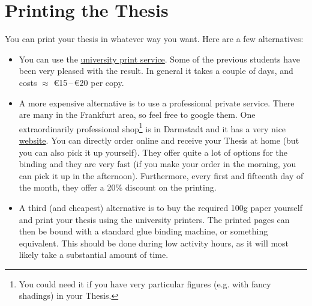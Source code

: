 \documentclass[a4paper]{article}
\begin{document}
    \section*{Printing the Thesis}
        You can print your thesis in whatever way you want. Here are a few alternatives:
        \begin{itemize}
            \item You can use the \href{http://druck.uni-frankfurt.de/druckzentrum/}{university print service}.
                  Some of the previous students have been very pleased with the result. In general it takes a couple of days,
                  and costs $\approx$ \euro{}15\,--\,\euro{}20 per copy.
            \item A more expensive alternative is to use a professional private service.
                  There are many in the Frankfurt area, so feel free to google them.
                  One extraordinarily professional shop\footnote{You could need it if you have very particular figures (e.g.
                    with fancy shadings) in your Thesis.} is in Darmstadt and it has a very nice \href{http://www.der-felger.de/}{website}.
                  You can directly order online and receive your Thesis at home (but you can also pick it up yourself).
                  They offer quite a lot of options for the binding and they are very fast (if you make your order in the morning, you can
                  pick it up in the afternoon). Furthermore, every first and fifteenth day of the month, they offer a 20\% discount on the printing.
            \item A third (and cheapest) alternative is to buy the required 100g paper yourself and print your thesis using the university
              printers. The printed pages can then be bound with a standard glue binding machine, or something equivalent. This should be done during
              low activity hours, as it will most likely take a substantial amount of time.
        \end{itemize}
        
    
\end{document}
